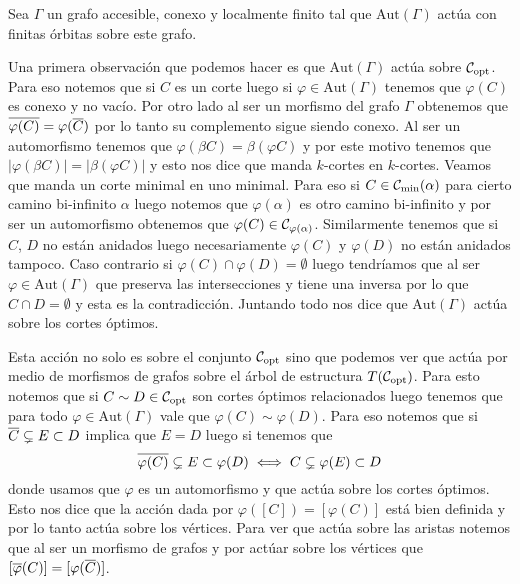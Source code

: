 \documentclass[tesis.tex]{subfiles}
\newcommand{\aut}{\text{Aut}}
\begin{document}
Sea $\Gamma$ un grafo accesible, conexo y localmente finito tal que $\aut(\Gamma)$ actúa con finitas órbitas sobre este grafo.

Una primera observación que podemos hacer es que $\aut(\Gamma)$ actúa sobre ${\cal C}_{\text{opt}}$.
Para eso notemos que si $C$ es un corte luego si $\varphi \in \aut(\Gamma)$ tenemos que $\varphi(C)$ es conexo y no vacío. 
Por otro lado al ser un morfismo del grafo $\Gamma$ obtenemos que $\overline{\varphi(C)} = \varphi(\overline C)$ por lo tanto su complemento sigue siendo conexo.
Al ser un automorfismo tenemos que $\varphi(\beta C) = \beta (\varphi C)$ y por este motivo tenemos que $|\varphi (\beta C)| = |\beta (\varphi C)|$ y esto nos dice que manda $k$-cortes en $k$-cortes.
Veamos que manda un corte minimal en uno minimal. 
Para eso si $C \in {{\cal C}}_{\text{min}}(\alpha)$ para cierto camino bi-infinito $\alpha$ luego notemos que $\varphi(\alpha)$ es otro camino bi-infinito y por ser un automorfismo obtenemos que $\varphi(C) \in {\cal C}_{\varphi(\alpha)}$.
Similarmente tenemos que si $C$, $D$ no están anidados luego necesariamente $\varphi(C)$ y $\varphi(D)$ no están anidados tampoco.
Caso contrario si $\varphi(C) \cap \varphi(D) = \emptyset$ luego tendríamos que al ser $\varphi \in \aut(\Gamma)$ que preserva las intersecciones y tiene una inversa por lo que $C \cap D = \emptyset$ y esta es la contradicción.
Juntando todo nos dice que $\aut(\Gamma)$ actúa sobre los cortes óptimos.

Esta acción no solo es sobre el conjunto ${\cal C}_{\text{opt}}$ sino que podemos ver que actúa por medio de morfismos de grafos sobre el árbol de estructura $T({\cal C}_{\text{opt}})$.
Para esto notemos que si $C \sim D \in {\cal C}_{\text{opt}}$ son cortes óptimos relacionados luego tenemos que para todo $\varphi \in \aut(\Gamma)$ vale que $\varphi(C) \sim \varphi(D)$.
Para eso notemos que si $\overline C \subsetneq E \subset D$ implica que $E = D$ luego si tenemos que
\[
	\overline {\varphi(C)} \subsetneq E \subset \varphi(D) \iff C \subsetneq \varphi(E) \subset D
\]  
donde usamos que $\varphi$ es un automorfismo y que actúa sobre los cortes óptimos.
Esto nos dice que la acción dada por $\varphi([C]) = [\varphi (C)]$ está bien definida y por lo tanto actúa sobre los vértices.
Para ver que actúa sobre las aristas notemos que al ser un morfismo de grafos y por actúar sobre los vértices que $[\overline \varphi(C)] = [\varphi (\overline C)]$.
\end{document}
